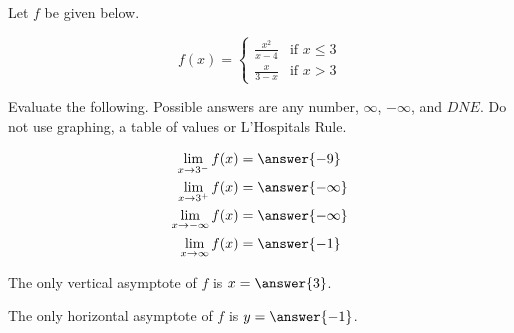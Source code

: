 \documentclass{ximera}
\author{Nela Lakos \and Kyle Parsons}
\begin{document}
\begin{exercise}

Let $f$ be given below.

\[
f(x) = 
\begin{cases}
\frac{x^2}{x-4} & \text{if } x\leq3\\
\frac{x}{3-x} & \text{if } x>3
\end{cases}
\]

Evaluate the following.  Possible answers are any number, $\infty$, $-\infty$, and $DNE$.  Do not use graphing, a table of values or L'Hospitals Rule.

\begin{align*}
\lim_{x\to3^-}f(x) &= \answer{-9}\\
\lim_{x\to3^+}f(x) &= \answer{-\infty}\\
\lim_{x\to-\infty}f(x) &= \answer{-\infty}\\
\lim_{x\to\infty}f(x) &= \answer{-1}
\end{align*}

\begin{exercise}

The only vertical asymptote of $f$ is $x=\answer{3}$.

\begin{exercise}

The only horizontal asymptote of $f$ is $y=\answer{-1}$.

\end{exercise}
\end{exercise}
\end{exercise}
\end{document}
